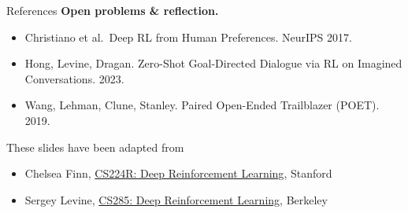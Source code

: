 \begin{frame}[allowframebreaks]{References}
\framebreak
\textbf{Open problems \& reflection.}
\begin{itemize}\itemsep0.15em
    \item Christiano et al.\ Deep RL from Human Preferences. NeurIPS 2017.
    \item Hong, Levine, Dragan. Zero-Shot Goal-Directed Dialogue via RL on Imagined
          Conversations. 2023.
    \item Wang, Lehman, Clune, Stanley. Paired Open-Ended Trailblazer (POET). 2019.
\end{itemize}
\vfill
These slides have been adapted from
\begin{itemize}
    \item Chelsea Finn, \href{https://cs224r.stanford.edu/}{CS224R: Deep Reinforcement
          Learning}, Stanford
    \item Sergey Levine, \href{https://rail.eecs.berkeley.edu/deeprlcourse/}{CS285: Deep
          Reinforcement Learning}, Berkeley
\end{itemize}
\end{frame}

